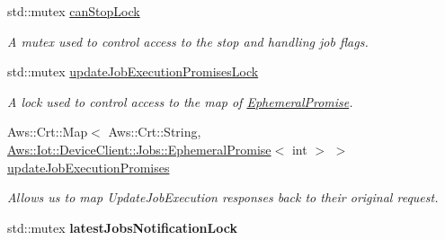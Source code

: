 \begin{DoxyCompactItemize}
\mbox{\label{class_aws_1_1_iot_1_1_device_client_1_1_jobs_1_1_jobs_feature_ae6a85898893eeec33ca229846157a500}} 
std\+::mutex \hyperlink{class_aws_1_1_iot_1_1_device_client_1_1_jobs_1_1_jobs_feature_ae6a85898893eeec33ca229846157a500}{can\+Stop\+Lock}
\begin{DoxyCompactList}\small\item\em A mutex used to control access to the stop and handling job flags. \end{DoxyCompactList}\item 
\mbox{\label{class_aws_1_1_iot_1_1_device_client_1_1_jobs_1_1_jobs_feature_ab4449de08e2cc376ff0c6942f56f15db}} 
std\+::mutex \hyperlink{class_aws_1_1_iot_1_1_device_client_1_1_jobs_1_1_jobs_feature_ab4449de08e2cc376ff0c6942f56f15db}{update\+Job\+Execution\+Promises\+Lock}
\begin{DoxyCompactList}\small\item\em A lock used to control access to the map of \hyperlink{class_aws_1_1_iot_1_1_device_client_1_1_jobs_1_1_ephemeral_promise}{Ephemeral\+Promise}. \end{DoxyCompactList}\item 
\mbox{\label{class_aws_1_1_iot_1_1_device_client_1_1_jobs_1_1_jobs_feature_afb82743d214fa7dce63125b5809fd97e}} 
Aws\+::\+Crt\+::\+Map$<$ Aws\+::\+Crt\+::\+String, \hyperlink{class_aws_1_1_iot_1_1_device_client_1_1_jobs_1_1_ephemeral_promise}{Aws\+::\+Iot\+::\+Device\+Client\+::\+Jobs\+::\+Ephemeral\+Promise}$<$ int $>$ $>$ \hyperlink{class_aws_1_1_iot_1_1_device_client_1_1_jobs_1_1_jobs_feature_afb82743d214fa7dce63125b5809fd97e}{update\+Job\+Execution\+Promises}
\begin{DoxyCompactList}\small\item\em Allows us to map Update\+Job\+Execution responses back to their original request. \end{DoxyCompactList}\item 
\mbox{\label{class_aws_1_1_iot_1_1_device_client_1_1_jobs_1_1_jobs_feature_ac836a3bd8d835654076ea56bc7a57745}} 
std\+::mutex {\bfseries latest\+Jobs\+Notification\+Lock}
\item 

\end{DoxyCompactItemize}
